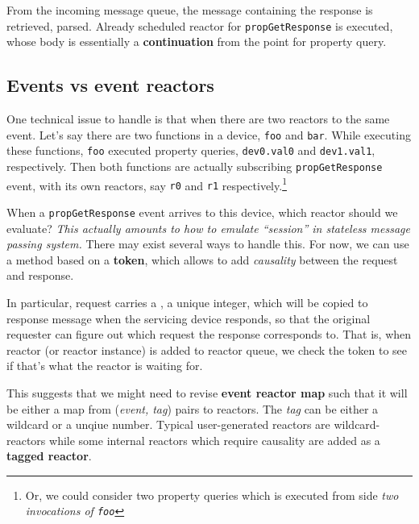 \documentclass{note}
\begin{document}
{\w {}
\ben
\w From the incoming message queue, the message containing the response 
   is retrieved, parsed.
\w Already scheduled reactor for \textcolor{red2}{\texttt{propGetResponse}}
   is executed, whose body is essentially a \textcolor{blue2}{\bf
     continuation} from the point for property query.
\een
\een

\subsection{Events vs event reactors}
One technical issue to handle is that when there are two reactors to the same
event. Let's say there are two functions in a device,
\textcolor{red2}{\texttt{foo}} and \textcolor{red2}{\texttt{bar}}.
While executing these functions, \textcolor{red2}{\texttt{foo}} executed
property queries, \textcolor{red2}{\texttt{dev0.val0}} and
\textcolor{red2}{\texttt{dev1.val1}}, respectively. 
Then both functions are actually subscribing
\textcolor{red2}{\texttt{propGetResponse}} event, with its own reactors,
say \textcolor{red2}{\texttt{r0}} and \textcolor{red2}{\texttt{r1}}
respectively.\footnote{Or, we could consider two property queries which is
  executed from side {\em two invocations of \textcolor{red2}{\texttt{foo}}}}

When a \textcolor{red2}{\texttt{propGetResponse}} event arrives to this
device, which reactor should we evaluate? \textcolor{blue2}{\em This actually amounts to how to emulate ``session'' in
  stateless message passing system.\/}
There may exist several ways to handle this. For now, we can use a method
based on a \textcolor{blue2}{\bf{}token}, which allows to add
\textcolor{blue2}{\em causality\/} between the request and response. 

In particular, request carries a , a unique integer, 
which will be copied to response message when the servicing device responds, 
so that the original requester can figure out which request the response
corresponds to.
That is, when reactor (or reactor instance) is added to reactor queue,
we check the token to see if that's what the reactor is waiting for.

This suggests that we might need to revise \textcolor{blue2}{\bf event reactor
  map} such that it will be either a map from ({\em event, tag\/}) pairs to
reactors. The {\em tag\/} can be either a wildcard or a unqiue number.
Typical user-generated reactors are wildcard-reactors while some
internal reactors which require causality are added as a \textcolor{blue2}{\bf
  tagged reactor\/}.


}
\end{document}
